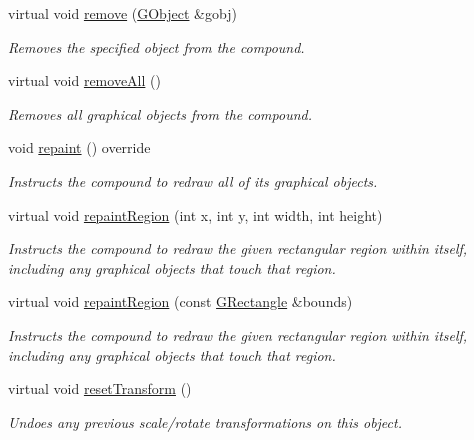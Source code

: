 \begin{DoxyCompactItemize}
virtual void \mbox{\hyperlink{classsgl_1_1GCompound_a0c0ae4d69b584602ff3cba0d9cf330a4}{remove}} (\mbox{\hyperlink{classsgl_1_1GObject}{G\+Object}} \&gobj)
\begin{DoxyCompactList}\small\item\em Removes the specified object from the compound. \end{DoxyCompactList}\item 
virtual void \mbox{\hyperlink{classsgl_1_1GCompound_a9b0a5a3ad9972ab0e8eb0b54873aac6b}{remove\+All}} ()
\begin{DoxyCompactList}\small\item\em Removes all graphical objects from the compound. \end{DoxyCompactList}\item 
void \mbox{\hyperlink{classsgl_1_1GCompound_afb8dbc55702230f0030e47d6c009697f}{repaint}} () override
\begin{DoxyCompactList}\small\item\em Instructs the compound to redraw all of its graphical objects. \end{DoxyCompactList}\item 
virtual void \mbox{\hyperlink{classsgl_1_1GCompound_a4a919e3851ebfbf0f161a66cc15d4531}{repaint\+Region}} (int x, int y, int width, int height)
\begin{DoxyCompactList}\small\item\em Instructs the compound to redraw the given rectangular region within itself, including any graphical objects that touch that region. \end{DoxyCompactList}\item 
virtual void \mbox{\hyperlink{classsgl_1_1GCompound_a769c46fb3e1004aec76e8b0adfa42aa6}{repaint\+Region}} (const \mbox{\hyperlink{structsgl_1_1GRectangle}{G\+Rectangle}} \&bounds)
\begin{DoxyCompactList}\small\item\em Instructs the compound to redraw the given rectangular region within itself, including any graphical objects that touch that region. \end{DoxyCompactList}\item 
virtual void \mbox{\hyperlink{classsgl_1_1GObject_a6022a1fd1e5dcd2fd5585e5a36aa3f37}{reset\+Transform}} ()
\begin{DoxyCompactList}\small\item\em Undoes any previous scale/rotate transformations on this object. \end{DoxyCompactList}\item 

\end{DoxyCompactItemize}
